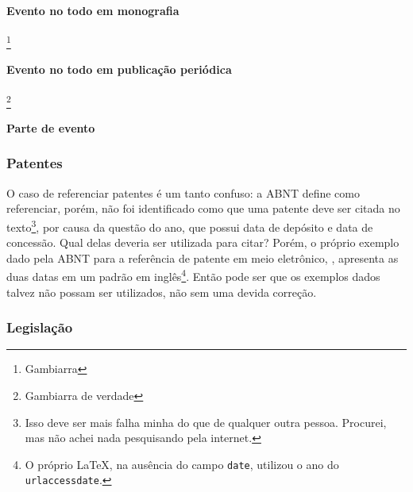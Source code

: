 \paragraph{Evento no todo em monografia}


\footnote{Gambiarra}

\paragraph{Evento no todo em publicação periódica}
\footnote{Gambiarra de verdade}

\paragraph{Parte de evento}



\subsubsection{Patentes}
O caso de referenciar patentes é um tanto confuso: a ABNT define como referenciar, porém, não foi identificado como que uma patente deve ser citada no texto\footnote{Isso deve ser mais falha minha do que de qualquer outra pessoa. Procurei, mas não achei nada pesquisando pela internet.}, por causa da questão do ano, que possui data de depósito e data de concessão. Qual delas deveria ser utilizada para citar? Porém, o próprio exemplo dado pela ABNT para a referência de patente em meio eletrônico, \cite{patente:eletronico}, apresenta as duas datas em um padrão em inglês\footnote{O próprio \LaTeX, na ausência do campo \texttt{date}, utilizou o ano do \texttt{urlaccessdate}.}. Então pode ser que os exemplos dados talvez não possam ser utilizados, não sem uma devida correção.




\subsubsection{Legislação}

